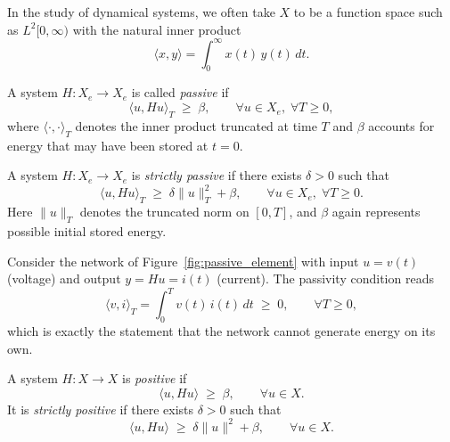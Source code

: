 \medskip
\noindent
In the study of dynamical systems, we often take $X$ to be a function space such as 
$L^2[0,\infty)$ with the natural inner product
\begin{equation}
    \langle x, y \rangle = \int_{0}^{\infty} x(t)\, y(t)\, dt.
\end{equation}

\begin{definition}
A system $H : X_e \to X_e$ is called \emph{passive} if
\begin{equation}
    \langle u, Hu \rangle_T \;\geq\; \beta,
    \qquad \forall u \in X_e, \; \forall T \ge 0,
\end{equation}
where $\langle \cdot, \cdot \rangle_T$ denotes the inner product truncated at time $T$ and 
$\beta$ accounts for energy that may have been stored at $t=0$.
\end{definition}

\begin{definition}
A system $H : X_e \to X_e$ is \emph{strictly passive} if there exists $\delta > 0$ such that
\begin{equation}
    \langle u, Hu \rangle_T \;\geq\; \delta \|u\|_T^2 + \beta,
    \qquad \forall u \in X_e, \; \forall T \ge 0.
\end{equation}
Here $\|u\|_T$ denotes the truncated norm on $[0,T]$, and $\beta$ again represents possible
initial stored energy.
\end{definition}

\begin{example}
Consider the network of Figure~\ref{fig:passive_element} with input $u = v(t)$ (voltage)
and output $y = Hu = i(t)$ (current). The passivity condition reads
\begin{equation}
    \langle v, i \rangle_T 
    = \int_{0}^{T} v(t)\, i(t)\, dt \;\geq\; 0,
    \qquad \forall T \ge 0,
\end{equation}
which is exactly the statement that the network cannot generate energy on its own.
\end{example}

\begin{definition}
A system $H : X \to X$ is \emph{positive} if
\begin{equation}
    \langle u, Hu \rangle \;\geq\; \beta, 
    \qquad \forall u \in X.
\end{equation}
It is \emph{strictly positive} if there exists $\delta > 0$ such that
\begin{equation}
    \langle u, Hu \rangle \;\geq\; \delta \|u\|^2 + \beta, 
    \qquad \forall u \in X.
\end{equation}
\end{definition}

